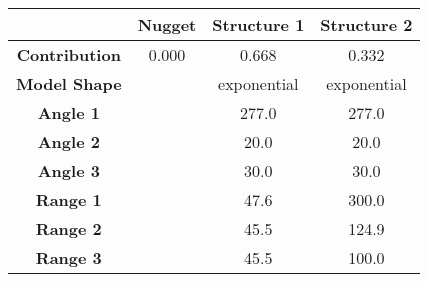 \begin{tabular}{cccc}
\toprule
{} & Nugget &  Structure 1 &  Structure 2 \\
\midrule
\textbf{Contribution} &  0.000 &        0.668 &        0.332 \\
\textbf{Model Shape } &        &  exponential &  exponential \\
\textbf{Angle 1     } &        &        277.0 &        277.0 \\
\textbf{Angle 2     } &        &         20.0 &         20.0 \\
\textbf{Angle 3     } &        &         30.0 &         30.0 \\
\textbf{Range 1     } &        &         47.6 &        300.0 \\
\textbf{Range 2     } &        &         45.5 &        124.9 \\
\textbf{Range 3     } &        &         45.5 &        100.0 \\
\bottomrule
\end{tabular}

